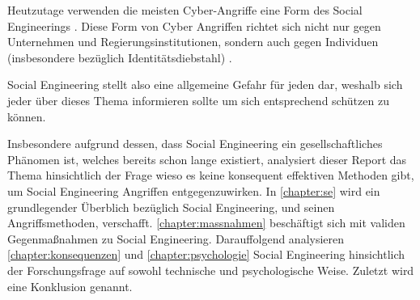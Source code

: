 Heutzutage verwenden die meisten Cyber-Angriffe eine Form des Social Engineerings .
Diese Form von Cyber Angriffen richtet sich nicht nur gegen Unternehmen und Regierungsinstitutionen,
sondern auch gegen Individuen (insbesondere bezüglich Identitätsdiebstahl) .

Social Engineering stellt also eine allgemeine Gefahr für jeden dar, weshalb sich jeder über dieses
Thema informieren sollte um sich entsprechend schützen zu können.

Insbesondere aufgrund dessen, dass Social Engineering ein gesellschaftliches Phänomen ist, welches bereits
schon lange existiert, analysiert dieser Report das Thema hinsichtlich der Frage wieso es keine konsequent effektiven
Methoden gibt, um Social Engineering Angriffen entgegenzuwirken.
In \autoref{chapter:se} wird ein grundlegender Überblich bezüglich Social Engineering, und seinen Angriffsmethoden, verschafft.
\autoref{chapter:massnahmen} beschäftigt sich mit validen Gegenmaßnahmen zu Social Engineering.
Darauffolgend analysieren \autoref{chapter:konsequenzen} und \autoref{chapter:psychologie} Social Engineering hinsichtlich der
Forschungsfrage auf sowohl technische und psychologische Weise. Zuletzt wird eine Konklusion genannt.
